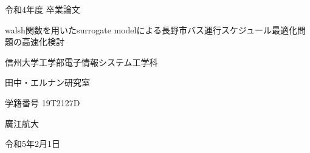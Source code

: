 \documentclass[main]{subfiles}
\begin{document}
\begin{titlepage}
    \fontsize{30truept}{30truept}\selectfont

    \centering
    \Huge
    令和4年度 卒業論文
    \vspace{15truept}

    walsh関数を用いたsurrogate modelによる長野市バス運行スケジュール最適化問題の高速化検討
    \vspace{45truept}

    信州大学工学部電子情報システム工学科
    \vspace{45truept}

    田中・エルナン研究室
    \vspace{15truept}

    学籍番号 19T2127D
    \vspace{15truept}

    廣江航大
    \vspace{45truept}

    令和5年2月1日
    \vspace{45truept}
\end{titlepage}
\end{document}
